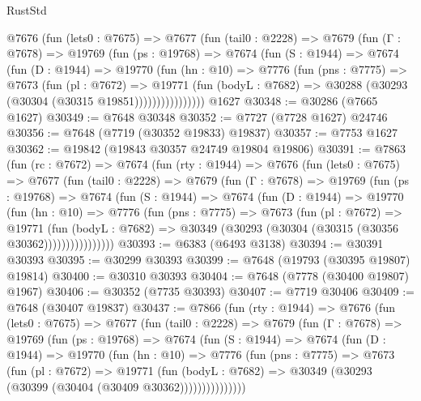 \begin{lexlean}{RustStd}
\begin{coremodule}
        @7676
          (fun (lets0 : @7675) =>
          @7677
            (fun (tail0 : @2228) =>
            @7679
              (fun (Γ : @7678) =>
              @19769
                (fun (ps : @19768) =>
                @7674
                  (fun (S : @1944) =>
                  @7674
                    (fun (D : @1944) =>
                    @19770
                      (fun (hn : @10) =>
                      @7776
                        (fun (pns : @7775) =>
                        @7673
                          (fun (pl : @7672) =>
                          @19771
                            (fun (bodyL : @7682) =>
                            @30288 (@30293 (@30304 (@30315 @19851))))))))))))))))
    @1627
@30348 := @30286 (@7665 @1627)
@30349 := @7648 @30348
@30352 := @7727 (@7728 @1627) @24746
@30356 := @7648 (@7719 (@30352 @19833) @19837)
@30357 := @7753 @1627
@30362 := @19842 (@19843 @30357 @24749 @19804 @19806)
@30391 := @7863
    (fun (rc : @7672) =>
    @7674
      (fun (rty : @1944) =>
      @7676
        (fun (lets0 : @7675) =>
        @7677
          (fun (tail0 : @2228) =>
          @7679
            (fun (Γ : @7678) =>
            @19769
              (fun (ps : @19768) =>
              @7674
                (fun (S : @1944) =>
                @7674
                  (fun (D : @1944) =>
                  @19770
                    (fun (hn : @10) =>
                    @7776
                      (fun (pns : @7775) =>
                      @7673
                        (fun (pl : @7672) =>
                        @19771
                          (fun (bodyL : @7682) =>
                          @30349 (@30293 (@30304 (@30315 (@30356 @30362))))))))))))))))
@30393 := @6383 (@6493 @3138)
@30394 := @30391 @30393
@30395 := @30299 @30393
@30399 := @7648 (@19793 (@30395 @19807) @19814)
@30400 := @30310 @30393
@30404 := @7648 (@7778 (@30400 @19807) @1967)
@30406 := @30352 (@7735 @30393)
@30407 := @7719 @30406
@30409 := @7648 (@30407 @19837)
@30437 := @7866
    (fun (rty : @1944) =>
    @7676
      (fun (lets0 : @7675) =>
      @7677
        (fun (tail0 : @2228) =>
        @7679
          (fun (Γ : @7678) =>
          @19769
            (fun (ps : @19768) =>
            @7674
              (fun (S : @1944) =>
              @7674
                (fun (D : @1944) =>
                @19770
                  (fun (hn : @10) =>
                  @7776
                    (fun (pns : @7775) =>
                    @7673
                      (fun (pl : @7672) =>
                      @19771
                        (fun (bodyL : @7682) =>
                        @30349 (@30293 (@30399 (@30404 (@30409 @30362)))))))))))))))

\end{coremodule}
\end{lexlean}
